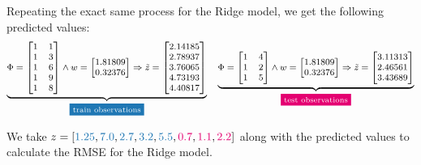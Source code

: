 \documentclass[12pt]{article}
\begin{document}
\begin{enumerate}
    \vspace{10pt}
    Repeating the exact same process for the Ridge model, we get the following predicted values:
    \begin{equation*}
        \footnotesize
        \underbrace{
        \Phi = \begin{bmatrix}
            1 & 1 \\
            1 & 3 \\
            1 & 6 \\
            1 & 9 \\
            1 & 8 
        \end{bmatrix} \land w = \begin{bmatrix}
            1.81809 \\
            0.32376
        \end{bmatrix} \Rightarrow \tilde{z} = \begin{bmatrix}
            2.14185 \\
            2.78937 \\
            3.76065 \\
            4.73193 \\
            4.40817
        \end{bmatrix}
        }_{\text{\colorbox{codeblue}{\textcolor{white}{train observations}}}}
        \quad \underbrace{
            \Phi = \begin{bmatrix}
            1 & 4 \\
            1 & 2 \\
            1 & 5 
        \end{bmatrix} \land w = \begin{bmatrix}
            1.81809 \\
            0.32376
        \end{bmatrix} \Rightarrow \tilde{z} = \begin{bmatrix}
            3.11313 \\
            2.46561 \\
            3.43689
        \end{bmatrix}
        }_{\text{\colorbox{codepink}{\textcolor{white}{test observations}}}}
    \end{equation*}
    
    We take $z = [\textcolor{codeblue}{1.25}, \textcolor{codeblue}{7.0}, \textcolor{codeblue}{2.7}, \textcolor{codeblue}{3.2}, \textcolor{codeblue}{5.5}, \textcolor{codepink}{0.7}, \textcolor{codepink}{1.1}, \textcolor{codepink}{2.2}]$ along with the predicted values to calculate the RMSE for the Ridge model.


\end{enumerate}
\end{document}
